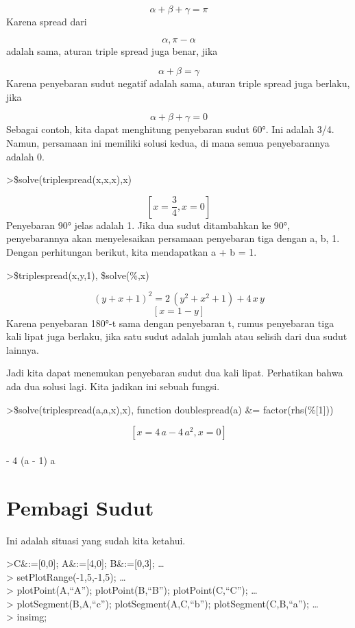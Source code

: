 \documentclass[
]{book}
\begin{document}
\[\alpha+\beta+\gamma=\pi\]Karena spread dari

\[\alpha, \pi-\alpha\]adalah sama, aturan triple spread juga benar, jika

\[\alpha+\beta=\gamma\]Karena penyebaran sudut negatif adalah sama, aturan triple spread juga berlaku, jika

\[\alpha+\beta+\gamma=0\]Sebagai contoh, kita dapat menghitung penyebaran sudut 60°. Ini adalah 3/4. Namun, persamaan ini memiliki solusi kedua, di mana semua penyebarannya adalah 0.

\textgreater\$solve(triplespread(x,x,x),x)

\[\left[ x=\frac{3}{4} , x=0 \right] \]Penyebaran 90° jelas adalah 1. Jika dua sudut ditambahkan ke 90°, penyebarannya akan menyelesaikan persamaan penyebaran tiga dengan a, b, 1. Dengan perhitungan berikut, kita mendapatkan a + b = 1.

\textgreater\$triplespread(x,y,1), \$solve(\%,x)

\[\left(y+x+1\right)^2=2\,\left(y^2+x^2+1\right)+4\,x\,y\]\[\left[ x=1-y \right] \]Karena penyebaran 180°-t sama dengan penyebaran t, rumus penyebaran tiga kali lipat juga berlaku, jika satu sudut adalah jumlah atau selisih dari dua sudut lainnya.

Jadi kita dapat menemukan penyebaran sudut dua kali lipat. Perhatikan bahwa ada dua solusi lagi. Kita jadikan ini sebuah fungsi.

\textgreater\$solve(triplespread(a,a,x),x), function doublespread(a) \&= factor(rhs(\%{[}1{]}))

\[\left[ x=4\,a-4\,a^2 , x=0 \right] \]\\
- 4 (a - 1) a

\section{Pembagi Sudut}\label{pembagi-sudut}

Ini adalah situasi yang sudah kita ketahui.

\textgreater C\&:={[}0,0{]}; A\&:={[}4,0{]}; B\&:={[}0,3{]}; \ldots{}\\
\textgreater{} setPlotRange(-1,5,-1,5); \ldots{}\\
\textgreater{} plotPoint(A,``A''); plotPoint(B,``B''); plotPoint(C,``C''); \ldots{}\\
\textgreater{} plotSegment(B,A,``c''); plotSegment(A,C,``b''); plotSegment(C,B,``a''); \ldots{}\\
\textgreater{} insimg;
\end{document}

